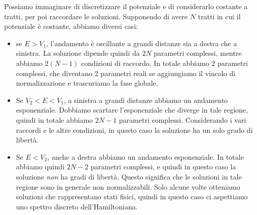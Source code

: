 \documentclass[a4paper, 11pt]{article}
\begin{document}
\noindent Possiamo immaginare di discretizzare il potenziale e di considerarlo costante a tratti, per poi raccordare le soluzioni. Supponendo di avere $N$ tratti in cui il potenziale è costante, abbiamo diversi casi:
\begin{itemize}
	\item se $E>V_1$, l'andamento è oscillante a grandi distanze sia a destra che a sinistra. La soluzione dipende quindi da $2N$ parametri complessi, mentre abbiamo $2(N-1)$ condizioni di raccordo. In totale abbiamo $2$ parametri complessi, che diventano 2 parametri reali se aggiungiamo il vincolo di normalizzazione e trascuriamo la fase globale.
	\item Se $V_2<E<V_1$, a sinistra a grandi distanze abbiamo un andamento esponenziale. Dobbiamo scartare l'esponenziale che diverge in tale regione, quindi in totale abbiamo $2N-1$ parametri complessi. Considerando i vari raccordi e le altre condizioni, in questo caso la soluzione ha un solo grado di libertà.
	\item Se $E<V_2$, anche a destra abbiamo un andamento esponenziale. In totale abbiamo quindi $2N-2$ parametri complessi, e quindi in questo caso la soluzione \textit{non} ha gradi di libertà. Questo significa che le soluzioni in tale regione sono in generale non normalizzabili. Solo alcune volte otteniamo soluzioni che rappresentano stati fisici, quindi in questo caso ci aspettiamo uno spettro discreto dell'Hamiltoniana.
\end{itemize}
\end{document}
